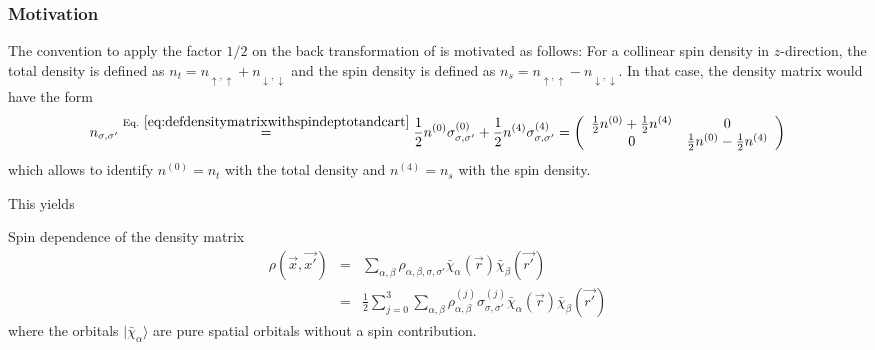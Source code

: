 \documentclass[11pt,a4paper]{report}
\begin{document}
\subsubsection{Motivation}
The convention to apply the factor $1/2$ on the back transformation of
 is motivated as follows:
For a collinear spin density in $z$-direction, the total density is
defined as $n_t=n_{\uparrow,\uparrow}+n_{\downarrow,\downarrow}$ and
the spin density is defined as
$n_s=n_{\uparrow,\uparrow}-n_{\downarrow,\downarrow}$. In that case,
the density matrix would have the form
\begin{eqnarray*}
n_{\sigma,\sigma'}
\eqrel{eq:defdensitymatrixwithspindeptotandcart}{=}
\frac{1}{2}n^{(0)}\sigma^{(0)}_{\sigma,\sigma'}
+\frac{1}{2}n^{(4)}\sigma^{(4)}_{\sigma,\sigma'}
=\left(\begin{array}{cc}\frac{1}{2}n^{(0)}+\frac{1}{2}n^{(4)}&0
\\0&\frac{1}{2}n^{(0)}-\frac{1}{2}n^{(4)}
\end{array}\right)
\end{eqnarray*}
which allows to identify $n^{(0)}=n_t$ with the total density and
$n^{(4)}=n_s$ with the spin density.


This yields
\begin{myshadowminipage}{Spin dependence of the density matrix}
\begin{eqnarray}
\rho(\vec{x},\vec{x'})
&=&\sum_{\alpha,\beta}\rho_{\alpha,\beta,\sigma,\sigma'}
\bar{\chi}_{\alpha}(\vec{r})\bar{\chi}_{\beta}(\vec{r'})
\\
&=&\frac{1}{2}\sum_{j=0}^3\sum_{\alpha,\beta}\rho_{\alpha,\beta}^{(j)}\sigma^{(j)}_{\sigma,\sigma'}
\bar{\chi}_{\alpha}(\vec{r})\bar{\chi}_{\beta}(\vec{r'})
\label{eq:denmatspindepcart}
\end{eqnarray}
where the orbitals $|\bar{\chi}_\alpha\rangle$ are pure spatial
orbitals without a spin contribution.
\end{myshadowminipage}



\end{document}
